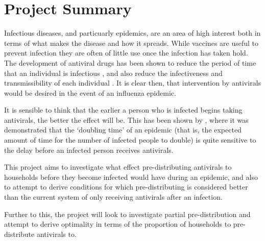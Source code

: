 \section{Project Summary}

Infectious diseases, and particuarly epidemics, are an area of high interest both in terms of what makes the disease and how it spreads. While vaccines are useful to prevent infection they are often of little use once the infection has taken hold. The development of antiviral drugs has been shown to reduce the period of time that an individual is infectious \cite{Stiver:2003}, and also reduce the infectiveness and transmissibility of each individual \cite{Hayden:2004}. It is clear then, that intervention by antivirals would be desired in the event of an influenza epidemic.

It is sensible to think that the earlier a person who is infected begins taking antivirals, the better the effect will be. This has been shown by \cite{Black:2013}, where it was demonstrated that the `doubling time' of an epidemic (that is, the expected amount of time for the number of infected people to double) is quite sensitive to the delay before an infected person receives antivirals.

This project aims to investigate what effect pre-distributing antivirals to households before they become infected would have during an epidemic, and also to attempt to derive conditions for which pre-distributing is considered better than the current system of only receiving antivirals after an infection.

Further to this, the project will look to investigate partial pre-distribution and attempt to derive optimality in terms of the proportion of households to pre-distribute antivirals to.